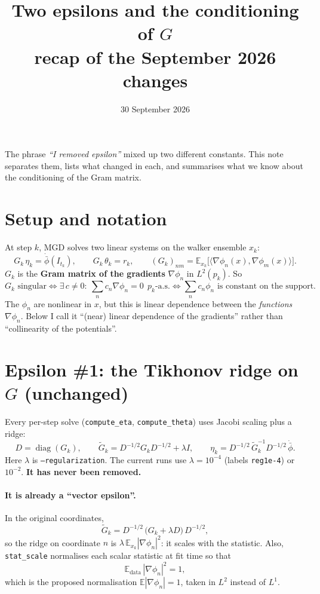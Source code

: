 \documentclass[11pt]{article}
\title{Two epsilons and the conditioning of $G$\\[2pt]\large recap of the September 2026 changes}
\author{}
\date{30 September 2026}
\newcommand{\E}{\mathbb{E}}
\newcommand{\code}[1]{\texttt{#1}}
\newcommand{\Gt}{\widetilde{G}}
\begin{document}
\maketitle

\noindent The phrase \emph{``I removed epsilon''} mixed up two different constants.
This note separates them, lists what changed in each, and summarises what we know
about the conditioning of the Gram matrix.

\section{Setup and notation}

At step $k$, MGD solves two linear systems on the walker ensemble $x_k$:
\[
  G_k\,\eta_k = \dot{\bar\phi}(I_{t_k}), \qquad
  G_k\,\theta_k = r_k, \qquad
  (G_k)_{nm} = \E_{x_k}\!\big[\langle \nabla\phi_n(x), \nabla\phi_m(x)\rangle\big].
\]
$G_k$ is the \textbf{Gram matrix of the gradients} $\nabla\phi_n$ in $L^2(p_k)$. So
\[
  G_k \text{ singular} \iff \exists\, c\neq 0:\ \textstyle\sum_n c_n \nabla\phi_n = 0 \ \ p_k\text{-a.s.}
  \iff \textstyle\sum_n c_n\phi_n \text{ is constant on the support.}
\]
The $\phi_n$ are nonlinear in $x$, but this is linear dependence between the
\emph{functions} $\nabla\phi_n$. Below I call it ``(near) linear dependence of the
gradients'' rather than ``collinearity of the potentials''.

\section{Epsilon \#1: the Tikhonov ridge on $G$ (unchanged)}

Every per-step solve (\code{compute\_eta}, \code{compute\_theta}) uses Jacobi scaling plus a ridge:
\[
  D = \operatorname{diag}(G_k),\qquad
  \Gt_k = D^{-1/2} G_k D^{-1/2} + \lambda I,\qquad
  \eta_k = D^{-1/2}\,\Gt_k^{-1} D^{-1/2}\,\dot{\bar\phi}.
\]
Here $\lambda$ is \code{--regularization}. The current runs use $\lambda = 10^{-4}$
(labels \code{reg1e-4}) or $10^{-2}$. \textbf{It has never been removed.}

\paragraph{It is already a ``vector epsilon''.} In the original coordinates,
\[
  \Gt_k = D^{-1/2}\,\big(G_k + \lambda D\big)\,D^{-1/2},
\]
so the ridge on coordinate $n$ is $\lambda\,\E_{x_k}|\nabla\phi_n|^2$: it scales with the
statistic. Also, \code{stat\_scale} normalises each scalar statistic at fit time so that
\[
  \E_{\text{data}}\,|\nabla\phi_n|^2 = 1 ,
\]
which is the proposed normalisation $\E|\nabla\phi_n| = 1$, taken in $L^2$ instead of $L^1$.
\end{document}
